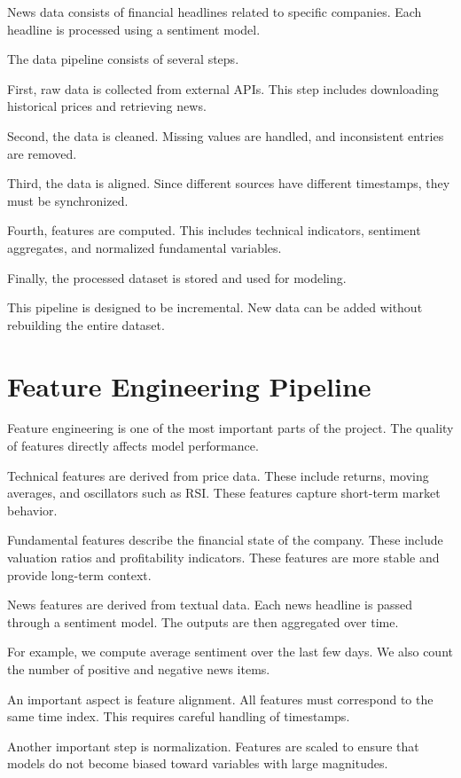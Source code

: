 \documentclass[12pt,a4paper]{article}
\begin{document}
News data consists of financial headlines related to specific companies. Each headline is processed using a sentiment model.

The data pipeline consists of several steps.

First, raw data is collected from external APIs. This step includes downloading historical prices and retrieving news.

Second, the data is cleaned. Missing values are handled, and inconsistent entries are removed.

Third, the data is aligned. Since different sources have different timestamps, they must be synchronized.

Fourth, features are computed. This includes technical indicators, sentiment aggregates, and normalized fundamental variables.

Finally, the processed dataset is stored and used for modeling.

This pipeline is designed to be incremental. New data can be added without rebuilding the entire dataset.

\section{Feature Engineering Pipeline}

Feature engineering is one of the most important parts of the project. The quality of features directly affects model performance.

Technical features are derived from price data. These include returns, moving averages, and oscillators such as RSI. These features capture short-term market behavior.

Fundamental features describe the financial state of the company. These include valuation ratios and profitability indicators. These features are more stable and provide long-term context.

News features are derived from textual data. Each news headline is passed through a sentiment model. The outputs are then aggregated over time.

For example, we compute average sentiment over the last few days. We also count the number of positive and negative news items.

An important aspect is feature alignment. All features must correspond to the same time index. This requires careful handling of timestamps.

Another important step is normalization. Features are scaled to ensure that models do not become biased toward variables with large magnitudes.
\end{document}
